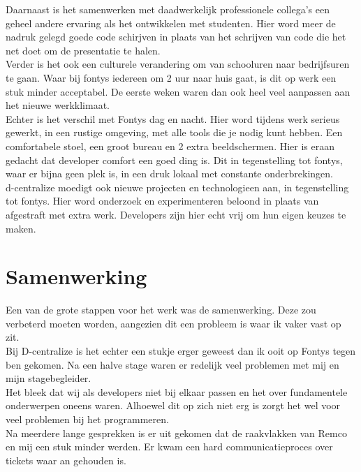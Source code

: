 Daarnaast is het samenwerken met daadwerkelijk professionele collega's een geheel andere ervaring als het ontwikkelen met studenten. Hier word meer de nadruk gelegd goede code schirjven in plaats van het schrijven van code die het net doet om de presentatie te halen. \\ 

Verder is het ook een culturele verandering om van schooluren naar bedrijfsuren te gaan. Waar bij fontys iedereen om 2 uur naar huis gaat, is dit op werk een stuk minder acceptabel. De eerste weken waren dan ook heel veel aanpassen aan het nieuwe werkklimaat. \\

Echter is het verschil met Fontys dag en nacht. Hier word tijdens werk serieus gewerkt, in een rustige omgeving, met alle tools die je nodig kunt hebben. Een comfortabele stoel, een groot bureau en 2 extra beeldschermen. Hier is eraan gedacht dat developer comfort een goed ding is. Dit in tegenstelling tot fontys, waar er bijna geen plek is, in een druk lokaal met constante onderbrekingen. \\

d-centralize moedigt ook nieuwe projecten en technologieen aan, in tegenstelling tot fontys. Hier word onderzoek en experimenteren beloond in plaats van afgestraft met extra werk. Developers zijn hier echt vrij om hun eigen keuzes te maken.

\section{Samenwerking}

Een van de grote stappen voor het werk was de samenwerking. Deze zou verbeterd moeten worden, aangezien dit een probleem is waar ik vaker vast op zit. \\

Bij D-centralize is het echter een stukje erger geweest dan ik ooit op Fontys tegen ben gekomen. Na een halve stage waren er redelijk veel problemen met mij en mijn stagebegleider. \\

Het bleek dat wij als developers niet bij elkaar passen en het over fundamentele onderwerpen oneens waren. Alhoewel dit op zich niet erg is zorgt het wel voor veel problemen bij het programmeren. \\

Na meerdere lange gesprekken is er uit gekomen dat de raakvlakken van Remco en mij een stuk minder werden. Er kwam een hard communicatieproces over tickets waar an gehouden is. \\

